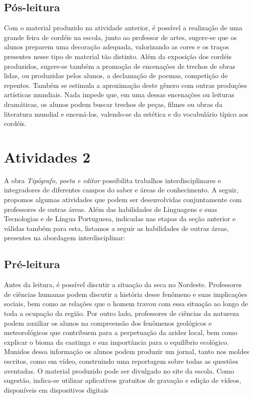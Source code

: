 \documentclass{extarticle}
\begin{document}
\subsection{Pós-leitura}


Com o material produzido na atividade anterior, é possível a
realização de uma grande feira de cordéis na escola, junto ao professor
de artes, sugere-se que os alunos preparem uma decoração adequada,
valorizando as cores e os traços presentes nesse tipo de material tão
distinto. Além da exposição dos cordéis produzidos, sugere-se também a
promoção de encenações de trechos de obras lidas, ou produzidas pelos
alunos, a declamação de poemas, competição de repentes. Também se
estimula a aproximação deste gênero com outras produções artísticas
mundiais. Nada impede que, em uma dessas encenações ou leituras
dramáticas, os alunos podem buscar trechos de peças, filmes ou obras da
literatura mundial e encená-los, valendo-se da estética e do vocabulário
típico aos cordéis.

\section{Atividades 2}


A obra \emph{Tipógrafo, poeta e editor} possibilita trabalhos
interdisciplinares e integradores de diferentes campos do saber e áreas
de conhecimento. A seguir, propomos algumas atividades que podem ser
desenvolvidas conjuntamente com professores de outras áreas. Além das
habilidades de Linguagens e suas Tecnologias e de Língua Portuguesa,
indicadas nas etapas da seção anterior e válidas também para esta,
listamos a seguir as habilidades de outras áreas, presentes na abordagem
interdisciplinar:

\subsection{Pré-leitura}

Antes da leitura, é possível discutir a situação da seca no
Nordeste. Professores de ciências humanas podem discutir a história
desse fenômeno e suas implicações sociais, bem como as relações que o
homem travou com essa situação ao longo de toda a ocupação da região.
Por outro lado, professores de ciências da natureza podem auxiliar os
alunos na compreensão dos fenômenos geológicos e meteorológicos que
contribuem para a perpetuação da aridez local, bem como explicar o bioma
da caatinga e sua importância para o equilíbrio ecológico. Munidos dessa
informação os alunos podem produzir um jornal, tanto nos moldes
escritos, como em vídeo, construindo uma reportagem sobre todas as
questões aventadas. O material produzido pode ser divulgado no site da
escola. Como sugestão, indica-se utilizar aplicativos gratuitos de
gravação e edição de vídeos, disponíveis em dispositivos digitais
\end{document}
